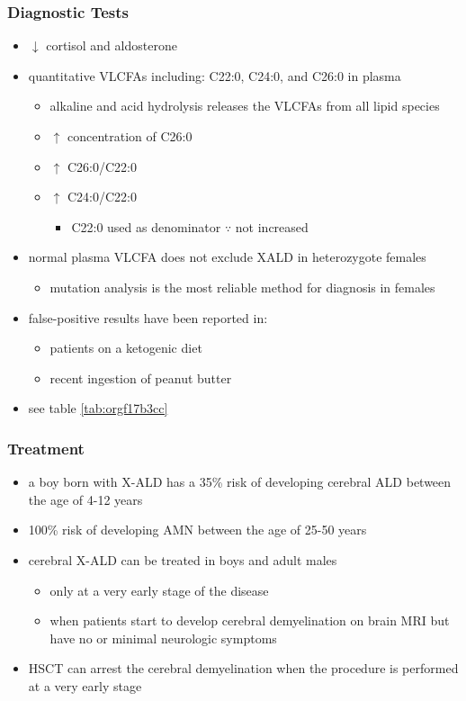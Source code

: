 \documentclass[12pt]{scrartcl}
\begin{document}
\subsubsection{Diagnostic Tests}
\label{sec:orgdeca534}
\begin{itemize}
\item \(\downarrow\) cortisol and aldosterone
\item quantitative VLCFAs including: C22:0, C24:0, and C26:0 in plasma
\begin{itemize}
\item alkaline and acid hydrolysis releases the VLCFAs from all lipid
species
\item \(\uparrow\) concentration of C26:0
\item \(\uparrow\) C26:0/C22:0
\item \(\uparrow\) C24:0/C22:0
\begin{itemize}
\item C22:0 used as denominator \(\because\) not increased
\end{itemize}
\end{itemize}
\item normal plasma VLCFA does not exclude XALD in heterozygote females
\begin{itemize}
\item mutation analysis is the most reliable method for diagnosis in females
\end{itemize}
\item false-positive results have been reported in:
\begin{itemize}
\item patients on a ketogenic diet
\item recent ingestion of peanut butter
\end{itemize}
\item see table \ref{tab:orgf17b3cc}
\end{itemize}
\subsubsection{Treatment}
\label{sec:orgf28107a}
\begin{itemize}
\item a boy born with X-ALD has a 35\% risk of developing cerebral ALD
between the age of 4-12 years
\item 100\% risk of developing AMN between the age of 25-50 years
\item cerebral X-ALD can be treated in boys and adult males
\begin{itemize}
\item only at a very early stage of the disease
\item when patients start to develop cerebral demyelination on brain MRI
but have no or minimal neurologic symptoms
\end{itemize}
\item HSCT can arrest the cerebral demyelination when the procedure is
performed at a very early stage
\end{itemize}
\end{document}
